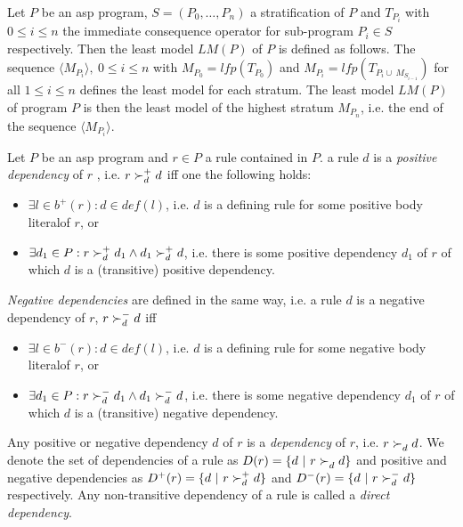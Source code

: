 \begin{definition}
\label{def:prelims-asp-semantics-stratified-eval}
Let $P$ be an \gls{asp} program, $S = (P_0,\ldots,P_n)$ a stratification of $P$ and $T_{P_i}$ with $0 \leq i \leq n$ the immediate consequence operator for sub-program $P_i \in S$ respectively. Then the least model $\mathit{LM}(P)$ of $P$ is defined as follows.
The sequence $\langle M_{P_i} \rangle,\ 0 \leq i \leq n$ with $M_{P_0} = \mathit{lfp}(T_{P_0})$ and $M_{P_i} = \mathit{lfp}(T_{P_i \cup\ M_{S_{i-1}}})$ for all $1 \leq i \leq n$ defines the least model for each stratum. The least model $LM(P)$ of program $P$ is then the least model of the highest stratum $M_{P_n}$, i.e. the end of the sequence $\langle M_{P_i} \rangle$.
\end{definition}

\begin{definition}[Dependencies]
\label{def:prelims-asp-semantics-dependencies}
Let $P$ be an \gls{asp} program and $r \in P$ a rule contained in $P$. a rule $d$ is a \emph{positive dependency} of $r$ , i.e. $ r \succ_{d}^{+} d$ iff one the following holds:
\begin{itemize}
	\item $\exists l \in b^{+}(r): d \in \mathit{def}(l) $, i.e. $d$ is a defining rule for some positive body literalof $r$, or
	\item $\exists d_1 \in P: r \succ_{d}^{+} d_1 \land d_1 \succ_{d}^{+} d$, i.e. there is some positive dependency $d_1$ of $r$ of which $d$ is a (transitive) positive dependency.
\end{itemize}
\emph{Negative dependencies} are defined in the same way, i.e. a rule $d$ is a negative dependency of $r$, $r \succ_{d}^{-} d$ iff
\begin{itemize}
	\item $\exists l \in b^{-}(r): d \in \mathit{def}(l)$, i.e. $d$ is a defining rule for some negative body literalof $r$, or
	\item $\exists d_1 \in P: r \succ_{d}^{-} d_1 \land d_1 \succ_{d}^{-} d$, i.e. there is some negative dependency $d_1$ of $r$ of which $d$ is a (transitive) negative dependency.
\end{itemize}
Any positive or negative dependency $d$ of $r$ is a \emph{dependency} of $r$, i.e. $r \succ_{d}^{} d$.
We denote the set of dependencies of a rule as $D(r) = \{ d\ |\ r \succ_{d}^{} d\}$ and positive and negative dependencies as $D^{+}(r) = \{ d\ |\ r \succ_{d}^{+} d\}$ and $D^{-}(r) = \{ d\ |\ r \succ_{d}^{-} d\}$ respectively. Any non-transitive dependency of a rule is called a \emph{direct dependency}.
\end{definition}


